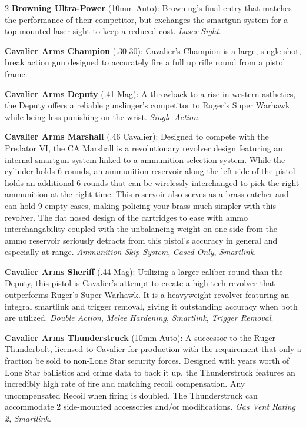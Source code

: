 \documentclass[
  oneside]{article}
\begin{document}
\begin{multicols}{2}
\textbf{Browning Ultra-Power} (10mm Auto):
Browning's final entry that matches the
performance of their competitor, but exchanges the
smartgun system for a top-mounted laser sight to
keep a reduced cost. \emph{Laser Sight}.

\textbf{Cavalier Arms Champion} (.30-30):
Cavalier's Champion is a large, single shot, break
action gun designed to accurately fire a full up
rifle round from a pistol frame.

\textbf{Cavalier Arms Deputy} (.41 Mag): A
throwback to a rise in western asthetics, the
Deputy offers a reliable gunslinger's competitor
to Ruger's Super Warhawk while being less
punishing on the wrist. \emph{Single Action}.

\textbf{Cavalier Arms Marshall} (.46 Cavalier):
Designed to compete with the Predator VI, the CA
Marshall is a revolutionary revolver design
featuring an internal smartgun system linked to a
ammunition selection system. While the cylinder
holds 6 rounds, an ammunition reservoir along the
left side of the pistol holds an additional 6
rounds that can be wirelessly interchanged to pick
the right ammunition at the right time. This
reservoir also serves as a brass catcher and can
hold 9 empty cases, making policing your brass
much simpler with this revolver. The flat nosed
design of the cartridges to ease with ammo
interchangability coupled with the unbalancing
weight on one side from the ammo reservoir
seriously detracts from this pistol's accuracy in
general and especially at range. \emph{Ammunition
Skip System}, \emph{Cased Only}, \emph{Smartlink}.

\textbf{Cavalier Arms Sheriff} (.44 Mag):
Utilizing a larger caliber round than the Deputy,
this pistol is Cavalier's attempt to create a high
tech revolver that outperforms Ruger's Super
Warhawk. It is a heavyweight revolver featuring an
integral smartlink and trigger removal, giving it
outstanding accuracy when both are utilized.
\emph{Double Action}, \emph{Melee Hardening},
\emph{Smartlink}, \emph{Trigger Removal}.

\textbf{Cavalier Arms Thunderstruck} (10mm Auto):
A successor to the Ruger Thunderbolt, licensed to
Cavalier for production with the requirement that
only a fraction be sold to non-Lone Star security
forces. Designed with years worth of Lone Star
ballistics and crime data to back it up, the
Thunderstruck features an incredibly high rate of
fire and matching recoil compensation. Any
uncompensated Recoil when firing is doubled. The
Thunderstruck can accommodate 2 side-mounted
accessories and/or modifications. \emph{Gas Vent
Rating 2}, \emph{Smartlink}.


\end{multicols}
\end{document}
